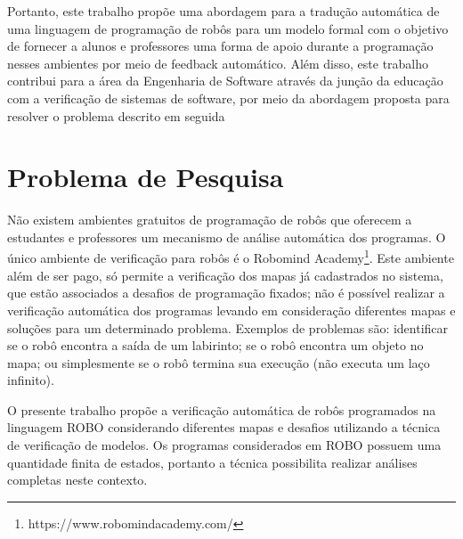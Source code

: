 Portanto, este trabalho propõe uma abordagem para a tradução automática de uma linguagem de programação de robôs para um modelo formal com o objetivo de fornecer a alunos e professores uma forma de apoio durante a programação nesses ambientes por meio de feedback automático. Além disso, este trabalho contribui para a área da Engenharia de Software através da junção da educação com a verificação de sistemas de software, por meio da abordagem proposta para resolver o problema descrito em seguida


\section{Problema de Pesquisa}
Não existem ambientes gratuitos de programação de robôs que oferecem a estudantes e professores um mecanismo de análise automática dos programas. O único ambiente de verificação para robôs é o Robomind Academy\footnote{https://www.robomindacademy.com/}. Este ambiente além de ser pago, só permite a verificação dos mapas já cadastrados no sistema, que estão associados a desafios de programação fixados; não é possível realizar a verificação automática dos programas levando em consideração diferentes mapas e soluções para um determinado problema. Exemplos de problemas são: identificar se o robô encontra a saída de um labirinto; se o robô encontra um objeto no mapa; ou simplesmente se o robô termina sua execução (não executa um laço infinito).



O presente trabalho propõe a verificação automática de robôs programados na linguagem ROBO considerando diferentes mapas e desafios utilizando a técnica de verificação de modelos. Os programas considerados em ROBO possuem uma quantidade finita de estados, portanto a técnica possibilita realizar análises completas neste contexto.

